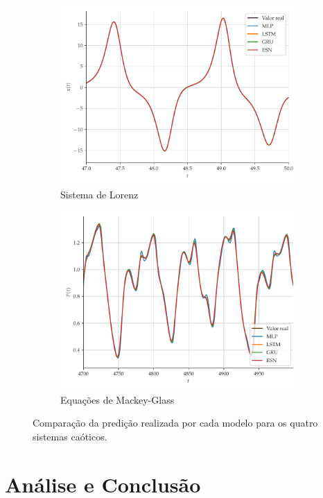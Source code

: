 \documentclass[a4paper, 12pt]{article}
\begin{document}
\begin{figure}[H]
\begin{subfigure}[t]{0.4\textwidth}
         \includegraphics[scale=0.35]{vs-lorenz-zoom.pdf}
         \caption{Sistema de Lorenz}
     \end{subfigure}
     \centering
     \begin{subfigure}[t]{0.4\textwidth}
     \centering
         \includegraphics[scale=0.35]{vs-mackeyglass-zoom.pdf}
         \caption{Equações de Mackey-Glass}
     \end{subfigure}
     \centering     
     \caption{Comparação da predição realizada por cada modelo para os quatro sistemas caóticos.}
     \label{fig:series-comparison}
\end{figure}


\section{Análise e Conclusão}
\end{document}
